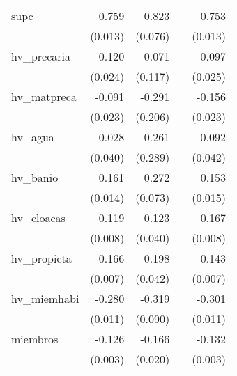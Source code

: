 {\begin{longtable}{l*{4}{D{.}{.}{-1}}}
\addlinespace
supc        &       0.759\sym{***}&       0.823\sym{***}&                     &       0.753\sym{***}\\
            &     (0.013)         &     (0.076)         &                     &     (0.013)         \\
\addlinespace
hv\_precaria &      -0.120\sym{***}&      -0.071         &                     &      -0.097\sym{***}\\
            &     (0.024)         &     (0.117)         &                     &     (0.025)         \\
\addlinespace
hv\_matpreca &      -0.091\sym{***}&      -0.291         &                     &      -0.156\sym{***}\\
            &     (0.023)         &     (0.206)         &                     &     (0.023)         \\
\addlinespace
hv\_agua     &       0.028         &      -0.261         &                     &      -0.092\sym{*}  \\
            &     (0.040)         &     (0.289)         &                     &     (0.042)         \\
\addlinespace
hv\_banio    &       0.161\sym{***}&       0.272\sym{***}&                     &       0.153\sym{***}\\
            &     (0.014)         &     (0.073)         &                     &     (0.015)         \\
\addlinespace
hv\_cloacas  &       0.119\sym{***}&       0.123\sym{**} &                     &       0.167\sym{***}\\
            &     (0.008)         &     (0.040)         &                     &     (0.008)         \\
\addlinespace
hv\_propieta &       0.166\sym{***}&       0.198\sym{***}&                     &       0.143\sym{***}\\
            &     (0.007)         &     (0.042)         &                     &     (0.007)         \\
\addlinespace
hv\_miemhabi &      -0.280\sym{***}&      -0.319\sym{***}&                     &      -0.301\sym{***}\\
            &     (0.011)         &     (0.090)         &                     &     (0.011)         \\
\addlinespace
miembros    &      -0.126\sym{***}&      -0.166\sym{***}&                     &      -0.132\sym{***}\\
            &     (0.003)         &     (0.020)         &                     &     (0.003)         \\

\end{longtable}}
